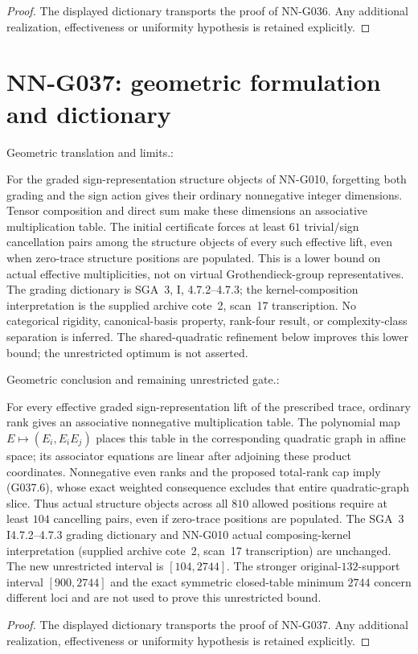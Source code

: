 \begin{proof} The displayed dictionary transports the proof of NN-G036. Any additional realization, effectiveness or uniformity hypothesis is retained explicitly.\end{proof}


\section{NN-G037: geometric formulation and dictionary}
\begin{geometricstatement}[NN-G037]
Geometric translation and limits.:

For the graded sign-representation structure objects of
NN-G010, forgetting both grading and the sign action
gives their ordinary nonnegative integer dimensions.
Tensor composition and direct sum make these dimensions
an associative multiplication table.
The initial certificate forces at least $61$ trivial/sign cancellation pairs
among the structure objects of every such effective lift,
even when zero-trace structure positions are populated.
This is a lower bound on actual effective multiplicities,
not on virtual Grothendieck-group representatives.
The grading dictionary is SGA~3, I, 4.7.2--4.7.3;
the kernel-composition interpretation is the supplied
archive cote~2, scan~17 transcription.
No categorical rigidity, canonical-basis property, rank-four
result, or complexity-class separation is inferred.
The shared-quadratic refinement below improves this lower bound;
the unrestricted optimum is not asserted.


Geometric conclusion and remaining unrestricted gate.:

For every effective graded sign-representation lift of the prescribed
trace, ordinary rank gives an associative nonnegative multiplication
table.  The polynomial map $E\mapsto(E_i,E_iE_j)$ places this table
in the corresponding quadratic graph in affine space; its associator
equations are linear after adjoining these product coordinates.
Nonnegative even ranks and the proposed total-rank cap imply
(G037.6), whose exact weighted consequence excludes that entire
quadratic-graph slice.  Thus actual structure objects across all
$810$ allowed positions require at least $104$ cancelling pairs,
even if zero-trace positions are populated.  The SGA~3 I4.7.2--4.7.3
grading dictionary and NN-G010 actual composing-kernel interpretation
(supplied archive cote~2, scan~17 transcription) are unchanged.
The new unrestricted interval is $[104,2744]$.  The stronger
original-$132$-support interval $[900,2744]$ and the exact symmetric
closed-table minimum $2744$ concern different loci and are not
used to prove this unrestricted bound.



\end{geometricstatement}
\begin{proof} The displayed dictionary transports the proof of NN-G037. Any additional realization, effectiveness or uniformity hypothesis is retained explicitly.\end{proof}


